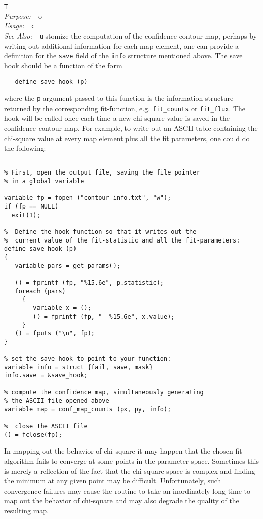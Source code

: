 \documentclass{book}
\makeatletter
\newif\ifpdf
\newenvironment{isisfunction}[4]%
{\index{{#1}@{\tt #1}}%
  \ifpdf
  \else
     \addcontentsline{toc}{subsection}{{#1} -- {#2}}
  \fi
  \vbox{
          \vspace*{\baselineskip}
          {\LARGE\tt #1}\vspace*{\baselineskip}\\
          {{\it Purpose:}~~{#2}}\\
          {{\it Usage:}~~{\tt #3}}\\
          {{\it See Also:}~~{\tt #4}}
       }
}%
{ }
\makeatother
\begin{document}
{\begin{isisfunction}
To customize the computation of the confidence contour map,
perhaps by writing out additional information for each map
element, one can provide a definition for the \verb|save|
field of the \verb|info| structure mentioned above.
The save hook should be a function of the form
\begin{verbatim}
   define save_hook (p)
\end{verbatim}
where the \verb|p| argument passed to this function is the
information structure returned by the corresponding fit-function,
e.g. \verb|fit_counts| or \verb|fit_flux|. The hook will be called
once each time a new chi-square value is saved in the confidence
contour map. For example, to write out an ASCII table containing
the chi-square value at every map element plus all the fit
parameters, one could do the following:
\begin{verbatim}

% First, open the output file, saving the file pointer
% in a global variable

variable fp = fopen ("contour_info.txt", "w");
if (fp == NULL)
  exit(1);

%  Define the hook function so that it writes out the
%  current value of the fit-statistic and all the fit-parameters:
define save_hook (p)
{
   variable pars = get_params();

   () = fprintf (fp, "%15.6e", p.statistic);
   foreach (pars)
     {
        variable x = ();
        () = fprintf (fp, "  %15.6e", x.value);
     }
   () = fputs ("\n", fp);
}

% set the save hook to point to your function:
variable info = struct {fail, save, mask}
info.save = &save_hook;

% compute the confidence map, simultaneously generating
% the ASCII file opened above
variable map = conf_map_counts (px, py, info);

%  close the ASCII file
() = fclose(fp);
\end{verbatim}

In mapping out the behavior of chi-square it may happen that the
chosen fit algorithm fails to converge at some points in the
parameter space.  Sometimes this is merely a reflection of the
fact that the chi-square space is complex and finding the minimum
at any given point may be difficult. Unfortunately, such
convergence failures may cause the routine to take an inordinately
long time to map out the behavior of chi-square and may also
degrade the quality of the resulting map.


\end{isisfunction}}
\end{document}
